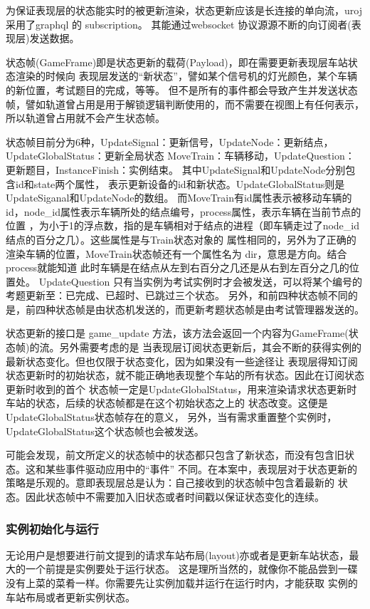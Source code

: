 为保证表现层的状态能实时的被更新渲染，状态更新应该是长连接的单向流，uroj采用了graphql 的 subscription。
其能通过websocket 协议源源不断的向订阅者(表现层)发送数据。

状态帧(GameFrame)即是状态更新的载荷(Payload)，即在需要更新表现层车站状态渲染的时候向
表现层发送的“新状态”，譬如某个信号机的灯光颜色，某个车辆的新位置，考试题目的完成，等等。
但不是所有的事件都会导致产生并发送状态帧，譬如轨道曾占用是用于解锁逻辑判断使用的，而不需要在视图上有任何表示，
所以轨道曾占用就不会产生状态帧。

状态帧目前分为6种，UpdateSignal：更新信号，UpdateNode：更新结点，UpdateGlobalStatus：更新全局状态
MoveTrain：车辆移动，UpdateQuestion：更新题目，InstanceFinish：实例结束。
其中UpdateSignal和UpdateNode分别包含id和state两个属性，
表示更新设备的id和新状态。UpdateGlobalStatus则是UpdateSiganal和UpdateNode的数组。
而MoveTrain有id属性表示被移动车辆的id，node\_id属性表示车辆所处的结点编号，process属性，表示车辆在当前节点的位置
，为小于1的浮点数，指的是车辆相对于结点的进程（即车辆走过了node\_id 结点的百分之几）。这些属性是与Train状态对象的
属性相同的，另外为了正确的渲染车辆的位置，MoveTrain状态帧还有一个属性名为 dir，意思是方向。结合process就能知道
此时车辆是在结点从左到右百分之几还是从右到左百分之几的位置处。
UpdateQuestion 只有当实例为考试实例时才会被发送，可以将某个编号的考题更新至：已完成、已超时、已跳过三个状态。
另外，和前四种状态帧不同的是，前四种状态帧是由状态机发送的，而更新考题状态帧是由考试管理器发送的。

状态更新的接口是 game\_update 方法，该方法会返回一个内容为GameFrame(状态帧)的流。另外需要考虑的是
当表现层订阅状态更新后，其会不断的获得实例的最新状态变化。但也仅限于状态变化，因为如果没有一些途径让
表现层得知订阅状态更新时的初始状态，就不能正确地表现整个车站的所有状态。因此在订阅状态更新时收到的首个
状态帧一定是UpdateGlobalStatus，用来渲染请求状态更新时车站的状态，后续的状态帧都是在这个初始状态之上的
状态改变。这便是UpdateGlobalStatus状态帧存在的意义，
另外，当有需求重置整个实例时，UpdateGlobalStatus这个状态帧也会被发送。

可能会发现，前文所定义的状态帧中的状态都只包含了新状态，而没有包含旧状态。这和某些事件驱动应用中的“事件”
不同。在本案中，表现层对于状态更新的策略是乐观的。意即表现层总是认为：自己接收到的状态帧中包含着最新的
状态。因此状态帧中不需要加入旧状态或者时间戳以保证状态变化的连续。

\subsubsection{实例初始化与运行}
无论用户是想要进行前文提到的请求车站布局(layout)亦或者是更新车站状态，最大的一个前提是实例要处于运行状态。
这是理所当然的，就像你不能品尝到一碟没有上菜的菜肴一样。你需要先让实例加载并运行在运行时内，才能获取
实例的车站布局或者更新实例状态。

